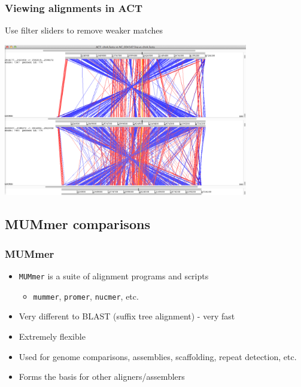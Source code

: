 \documentclass[table]{beamer}
\begin{document}
    \begin{frame}
      \frametitle{Viewing alignments in ACT}
      Use filter sliders to remove weaker matches
      \begin{center}
        \includegraphics[width=0.8\textwidth]{images/act_wgs7}
      \end{center}
    \end{frame}

\subsection{MUMmer comparisons}

  \begin{frame}
    \frametitle{MUMmer}
    \begin{itemize}
      \item \texttt{MUMmer} is a suite of alignment programs and scripts
      \begin{itemize}
        \item \texttt{mummer}, \texttt{promer}, \texttt{nucmer}, etc.
      \end{itemize}
      \item Very different to BLAST (suffix tree alignment) - very fast
      \item Extremely flexible
      \item Used for genome comparisons, assemblies, scaffolding, repeat detection, etc.
      \item Forms the basis for other aligners/assemblers
    \end{itemize}
\end{frame}
\end{document}
